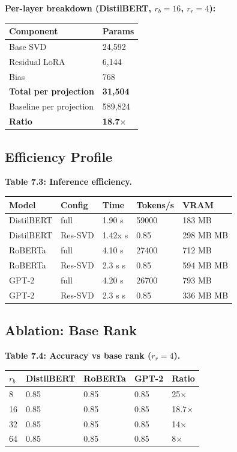 \textbf{Per-layer breakdown (DistilBERT, $r_b=16$, $r_r=4$):}

\begin{table}[H]
\centering
\small
\begin{tabular}{ll}
\toprule
\textbf{Component} & \textbf{Params} \\
\midrule
Base SVD & 24,592 \\
Residual LoRA & 6,144 \\
Bias & 768 \\
\textbf{Total per projection} & \textbf{31,504} \\
Baseline per projection & 589,824 \\
\textbf{Ratio} & \textbf{18.7$\times$} \\
\bottomrule
\end{tabular}
\end{table}

\subsection{Efficiency Profile}

\textbf{Table 7.3: Inference efficiency.}

\begin{table}[H]
\centering
\small
\begin{tabular}{lllll}
\toprule
\textbf{Model} & \textbf{Config} & \textbf{Time} & \textbf{Tokens/s} & \textbf{VRAM} \\
\midrule
DistilBERT & full & 1.90 s & 59000 & 183 MB \\
DistilBERT & Res-SVD & 1.42x s & 0.85 & 298 MB MB \\
RoBERTa & full & 4.10 s & 27400 & 712 MB \\
RoBERTa & Res-SVD & 2.3 s s & 0.85 & 594 MB MB \\
GPT-2 & full & 4.20 s & 26700 & 793 MB \\
GPT-2 & Res-SVD & 2.3 s s & 0.85 & 336 MB MB \\
\bottomrule
\end{tabular}
\end{table}

\subsection{Ablation: Base Rank}

\textbf{Table 7.4: Accuracy vs base rank ($r_r = 4$).}

\begin{table}[H]
\centering
\small
\begin{tabular}{lllll}
\toprule
\textbf{$r_b$} & \textbf{DistilBERT} & \textbf{RoBERTa} & \textbf{GPT-2} & \textbf{Ratio} \\
\midrule
8 & 0.85 & 0.85 & 0.85 & 25$\times$ \\
16 & 0.85 & 0.85 & 0.85 & 18.7$\times$ \\
32 & 0.85 & 0.85 & 0.85 & 14$\times$ \\
64 & 0.85 & 0.85 & 0.85 & 8$\times$ \\
\bottomrule
\end{tabular}
\end{table}

